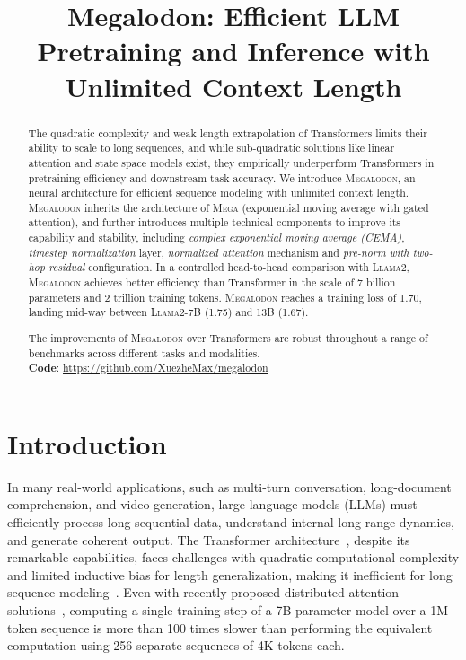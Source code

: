 \title{Megalodon: Efficient LLM Pretraining and Inference with Unlimited Context Length}

\begin{abstract}
The quadratic complexity and weak length extrapolation of Transformers limits their ability to scale to long sequences, and while sub-quadratic solutions like linear attention and state space models exist, they empirically underperform Transformers in pretraining efficiency and downstream task accuracy. We introduce \textsc{Megalodon}, an neural architecture for efficient sequence modeling with unlimited context length.
\textsc{Megalodon} inherits the architecture of \textsc{Mega} (exponential moving average with gated attention), and further introduces multiple technical components to improve its capability and stability, including \emph{complex exponential moving average (CEMA)}, \emph{timestep normalization} layer, \emph{normalized attention} mechanism and \emph{pre-norm with two-hop residual} configuration. In a controlled head-to-head comparison with \textsc{Llama}2, 
\textsc{Megalodon} achieves better efficiency than Transformer in the scale of 7 billion parameters and 2 trillion training tokens.
\textsc{Megalodon} reaches a training loss of 1.70, landing mid-way between \textsc{Llama}2-7B (1.75) and 13B (1.67). 

The improvements of \textsc{Megalodon} over Transformers are robust throughout a range of benchmarks across different tasks and modalities. \\
\textbf{Code}: \url{https://github.com/XuezheMax/megalodon}
\end{abstract}

\section{Introduction}
In many real-world applications, such as multi-turn conversation, long-document comprehension, and video generation, large language models (LLMs) must efficiently process long sequential data, understand internal long-range dynamics, and generate coherent output. The Transformer architecture~\citep{Vaswani+2017}, despite its remarkable capabilities, faces challenges with quadratic computational complexity and limited inductive bias for length generalization, making it inefficient for long sequence modeling~\citep{wang2024limits,zhou2024transformers}. Even with recently proposed distributed attention solutions~\citep{li2023lightseq,liu2024ring}, computing a single training step of a 7B parameter model over a 1M-token sequence is more than 100 times slower than performing the equivalent computation using 256 separate sequences of 4K tokens each.

